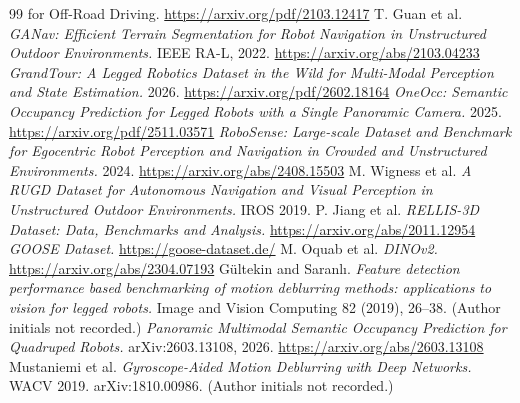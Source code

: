 \documentclass[11pt]{article}
\begin{document}
\begin{thebibliography}{99}
{  for Off-Road Driving.} \url{https://arxiv.org/pdf/2103.12417}
 T. Guan et al. \emph{GANav: Efficient Terrain Segmentation for Robot
  Navigation in Unstructured Outdoor Environments.} IEEE RA-L, 2022.
  \url{https://arxiv.org/abs/2103.04233}
 \emph{GrandTour: A Legged Robotics Dataset in the Wild for
  Multi-Modal Perception and State Estimation.} 2026.
  \url{https://arxiv.org/pdf/2602.18164}
 \emph{OneOcc: Semantic Occupancy Prediction for Legged Robots with a
  Single Panoramic Camera.} 2025. \url{https://arxiv.org/pdf/2511.03571}
 \emph{RoboSense: Large-scale Dataset and Benchmark for Egocentric
  Robot Perception and Navigation in Crowded and Unstructured Environments.} 2024.
  \url{https://arxiv.org/abs/2408.15503}
 M. Wigness et al. \emph{A RUGD Dataset for Autonomous Navigation and
  Visual Perception in Unstructured Outdoor Environments.} IROS 2019.
 P. Jiang et al. \emph{RELLIS-3D Dataset: Data, Benchmarks and Analysis.}
  \url{https://arxiv.org/abs/2011.12954}
 \emph{GOOSE Dataset.} \url{https://goose-dataset.de/}
 M. Oquab et al. \emph{DINOv2.} \url{https://arxiv.org/abs/2304.07193}
 G\"ultekin and Saranl\i. \emph{Feature detection performance based
  benchmarking of motion deblurring methods: applications to vision for legged robots.}
  Image and Vision Computing 82 (2019), 26--38. (Author initials not recorded.)
 \emph{Panoramic Multimodal Semantic Occupancy Prediction for
  Quadruped Robots.} arXiv:2603.13108, 2026. \url{https://arxiv.org/abs/2603.13108}
 Mustaniemi et al. \emph{Gyroscope-Aided Motion Deblurring with Deep
  Networks.} WACV 2019. arXiv:1810.00986. (Author initials not recorded.)
\end{thebibliography}
\end{document}

